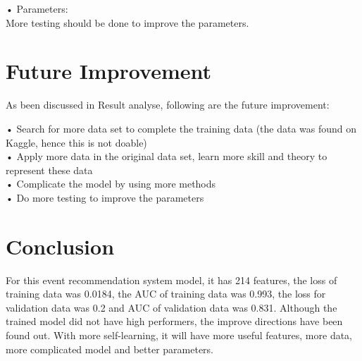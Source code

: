 \documentclass{article}
\begin{document}
•	Parameters:\\
	More testing should be done to improve the parameters.\\

\section{Future Improvement}

As been discussed in Result analyse, following are the future improvement:

•	Search for more data set to complete the training data (the data was found on Kaggle, hence this is not doable)\\
•	Apply more data in the original data set, learn more skill and theory to represent these data\\
•	Complicate the model by using more methods\\
•	Do more testing to improve the parameters\\

\section{Conclusion}

For this event recommendation system model, it has 214 features, the loss of training data was 0.0184, the AUC of training data was 0.993, the loss for validation data was 0.2 and AUC of validation data was 0.831. Although the trained model did not have high performers, the improve directions have been found out. With more self-learning, it will have more useful features, more data, more complicated model and better parameters. 
\end{document}
